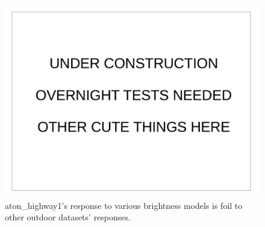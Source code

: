 \documentclass[12pt]{report}
\begin{document}
\begin{figure}
\centering
  \includegraphics[width=.7\linewidth]{figures/placeholder.jpg}
\caption{aton\_highway1's response to various brightness models is foil to other outdoor datasets' responses.}
\label{fig:highway1_reciprocal}
\end{figure}

\end{document}
